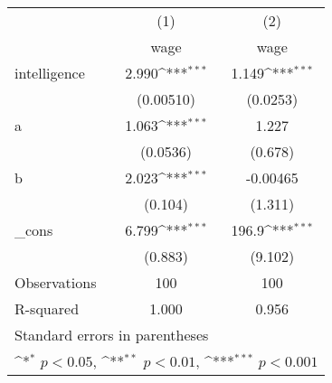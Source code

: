 {
\def\sym#1{\ifmmode^{#1}\else\(^{#1}\)\fi}
\begin{tabular}{l*{2}{c}}
\hline\hline
            &\multicolumn{1}{c}{(1)}&\multicolumn{1}{c}{(2)}\\
            &\multicolumn{1}{c}{wage}&\multicolumn{1}{c}{wage}\\
\hline
intelligence&       2.990\sym{***}&       1.149\sym{***}\\
            &   (0.00510)         &    (0.0253)         \\
[1em]
a           &       1.063\sym{***}&       1.227         \\
            &    (0.0536)         &     (0.678)         \\
[1em]
b           &       2.023\sym{***}&    -0.00465         \\
            &     (0.104)         &     (1.311)         \\
[1em]
\_cons      &       6.799\sym{***}&       196.9\sym{***}\\
            &     (0.883)         &     (9.102)         \\
\hline
Observations&         100         &         100         \\
R-squared   &       1.000         &       0.956         \\
\hline\hline
\multicolumn{3}{l}{\footnotesize Standard errors in parentheses}\\
\multicolumn{3}{l}{\footnotesize \sym{*} \(p<0.05\), \sym{**} \(p<0.01\), \sym{***} \(p<0.001\)}\\
\end{tabular}
}
